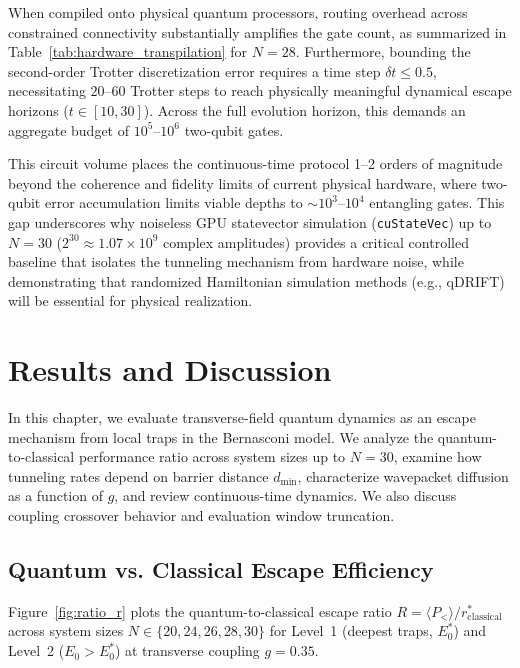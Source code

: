 \documentclass[12pt,a4paper]{report}
\begin{document}
When compiled onto physical quantum processors, routing overhead across constrained connectivity substantially amplifies the gate count, as summarized in Table~\ref{tab:hardware_transpilation} for $N = 28$. Furthermore, bounding the second-order Trotter discretization error requires a time step $\delta t \le 0.5$, necessitating $20$--$60$ Trotter steps to reach physically meaningful dynamical escape horizons ($t \in [10, 30]$). Across the full evolution horizon, this demands an aggregate budget of $10^5$--$10^6$ two-qubit gates.

This circuit volume places the continuous-time protocol 1--2 orders of magnitude beyond the coherence and fidelity limits of current physical hardware, where two-qubit error accumulation limits viable depths to $\sim 10^3$--$10^4$ entangling gates. This gap underscores why noiseless GPU statevector simulation (\texttt{cuStateVec}) up to $N = 30$ ($2^{30} \approx 1.07 \times 10^9$ complex amplitudes) provides a critical controlled baseline that isolates the tunneling mechanism from hardware noise, while demonstrating that randomized Hamiltonian simulation methods (e.g., qDRIFT) will be essential for physical realization.

\chapter{Results and Discussion}
\label{ch:results}

In this chapter, we evaluate transverse-field quantum dynamics as an escape mechanism from local traps in the Bernasconi model. We analyze the quantum-to-classical performance ratio across system sizes up to $N = 30$, examine how tunneling rates depend on barrier distance $d_{\min}$, characterize wavepacket diffusion as a function of $g$, and review continuous-time dynamics. We also discuss coupling crossover behavior and evaluation window truncation.

\section{Quantum vs. Classical Escape Efficiency}
\label{sec:results_ratio}
Figure~\ref{fig:ratio_r} plots the quantum-to-classical escape ratio $R = \langle P_< \rangle / r_{\mathrm{classical}}^*$ across system sizes $N \in \{20, 24, 26, 28, 30\}$ for Level~1 (deepest traps, $E_0^*$) and Level~2 ($E_0 > E_0^*$) at transverse coupling $g = 0.35$.
\end{document}
